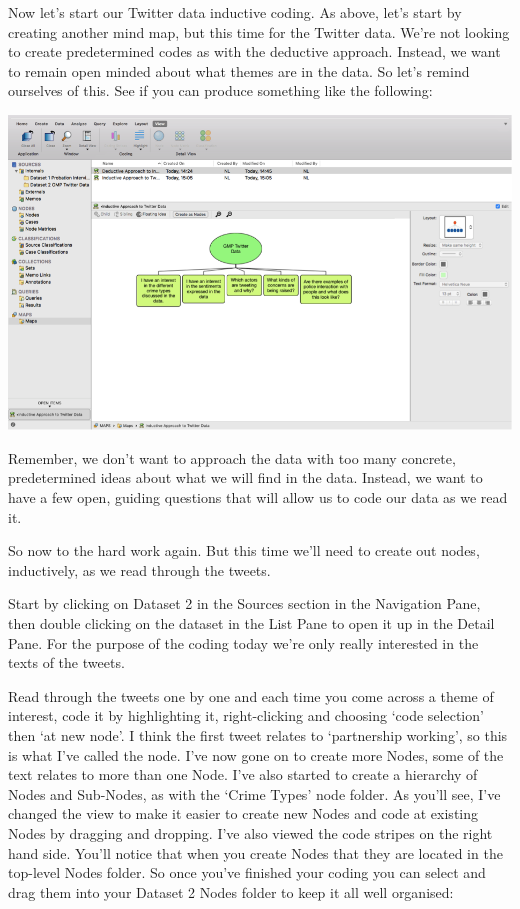 \documentclass[]{book}
\theoremstyle{definition}
\theoremstyle{definition}
\theoremstyle{definition}
\theoremstyle{remark}
\begin{document}
Now let's start our Twitter data inductive coding. As above, let's start
by creating another mind map, but this time for the Twitter data. We're
not looking to create predetermined codes as with the deductive
approach. Instead, we want to remain open minded about what themes are
in the data. So let's remind ourselves of this. See if you can produce
something like the following:

\includegraphics{imgs/qual_49.png}

Remember, we don't want to approach the data with too many concrete,
predetermined ideas about what we will find in the data. Instead, we
want to have a few open, guiding questions that will allow us to code
our data as we read it.

So now to the hard work again. But this time we'll need to create out
nodes, inductively, as we read through the tweets.

Start by clicking on Dataset 2 in the Sources section in the Navigation
Pane, then double clicking on the dataset in the List Pane to open it up
in the Detail Pane. For the purpose of the coding today we're only
really interested in the texts of the tweets.

Read through the tweets one by one and each time you come across a theme
of interest, code it by highlighting it, right-clicking and choosing
`code selection' then `at new node'. I think the first tweet relates to
`partnership working', so this is what I've called the node. I've now
gone on to create more Nodes, some of the text relates to more than one
Node. I've also started to create a hierarchy of Nodes and Sub-Nodes, as
with the `Crime Types' node folder. As you'll see, I've changed the view
to make it easier to create new Nodes and code at existing Nodes by
dragging and dropping. I've also viewed the code stripes on the right
hand side. You'll notice that when you create Nodes that they are
located in the top-level Nodes folder. So once you've finished your
coding you can select and drag them into your Dataset 2 Nodes folder to
keep it all well organised:
\end{document}
